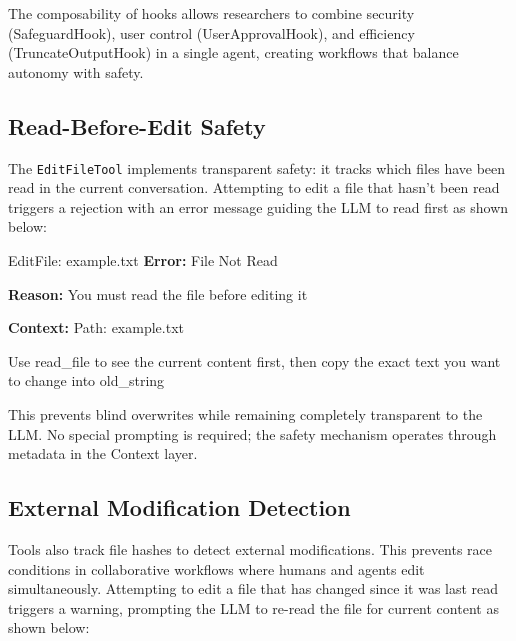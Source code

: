 \documentclass{article}
\begin{document}
The composability of hooks allows researchers to combine security (SafeguardHook), user control (UserApprovalHook), and efficiency (TruncateOutputHook) in a single agent, creating workflows that balance autonomy with safety.

\subsection{Read-Before-Edit Safety}

The \texttt{EditFileTool} implements transparent safety: it tracks which files have been read in the current conversation. Attempting to edit a file that hasn't been read triggers a rejection with an error message guiding the LLM to read first as shown below:


\begin{orchestraltoolerrormessage}{EditFile: example.txt}
\textbf{Error:} File Not Read

\textbf{Reason:} You must read the file before editing it

\textbf{Context:} Path: example.txt

Use read\_file to see the current content first, then copy the exact text you want to change into old\_string
\end{orchestraltoolerrormessage}

This prevents blind overwrites while remaining completely transparent to the LLM. No special prompting is required; the safety mechanism operates through metadata in the Context layer.

\subsection{External Modification Detection}

Tools also track file hashes to detect external modifications.
This prevents race conditions in collaborative workflows where humans and agents edit simultaneously. Attempting to edit a file that has changed since it was last read triggers a warning, prompting the LLM to re-read the file for current content as shown below:
\end{document}
